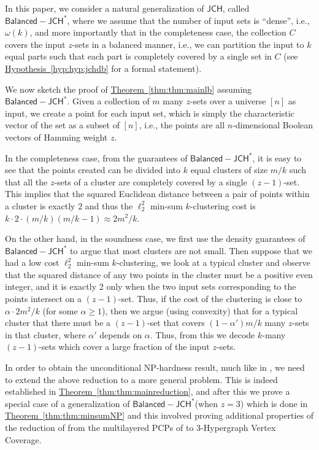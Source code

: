 \documentclass[10pt,a4paper]{amsart}
\newcommand{\namedref}[2]{\hyperref[#2]{#1~\ref*{#2}}}
\newcommand{\thmref}[1]{\namedref{Theorem}{thm:#1}}
\newcommand{\hypref}[1]{\namedref{Hypothesis}{hyp:#1}}
\newcommand{\JCH}{$\mathsf{JCH}$\xspace}
\newcommand{\JCHDB}{$\mathsf{Balanced-JCH}^*$\xspace}
\begin{document}
In this paper, we consider a natural generalization of \JCH, called \JCHDB, where we assume that the number of input sets is ``dense'', i.e., $\omega(k)$, and more importantly that in the completeness case,  the collection $C$ covers the input $z$-sets in a balanced manner, i.e., we can partition the input to $k$ equal parts such that each part is completely covered by a single set in $C$ (see \hypref{hyp:jchdb} for a formal statement). 


We now sketch the proof of \thmref{thm:mainlb} assuming \JCHDB. Given a collection of $m$ many $z$-sets over a universe $[n]$ as input, we create a point for each input set, which is simply the characteristic vector of the set as a subset of $[n]$, i.e., the points are all $n$-dimensional Boolean vectors of Hamming
weight $z$. 

In the
completeness case, from the guarantees of \JCHDB, it is easy to see that the points created can be divided into $k$ equal clusters of size $m/k$ such that all the $z$-sets of a cluster are completely covered by a single $(z-1)$-set. This implies that the squared Euclidean distance between a pair of points within a cluster is exactly $2$ and thus the $\ell_2^2$ min-sum $k$-clustering cost is $k\cdot 2\cdot (m/k)(m/k-1)\approx 2m^2/k$.

On the other hand, in the soundness case, we first use the density guarantees of \JCHDB to argue that most clusters are not small. Then suppose that we had a low cost $\ell_2^2$ min-sum $k$-clustering, we look at a typical cluster and observe that the squared distance  of any two points  in the cluster must be a positive even integer, and it is exactly 2 only when the two input sets corresponding to the points intersect on a $(z-1)$-set. Thus, if the cost of the clustering is close to $\alpha \cdot 2m^2/k$ (for some $\alpha\ge 1$), then we argue (using convexity) that for a typical cluster that there must be a $(z-1)$-set that covers $(1-\alpha')m/k$ many $z$-sets in that cluster, where $\alpha'$ depends on $\alpha$. Thus, from this we decode $k$-many $(z-1)$-sets which cover a large fraction of the input $z$-sets. 

In order to obtain the unconditional NP-hardness result, much like in \cite{Cohen-AddadSL22}, we need to extend the above reduction to a more general problem. This is indeed established in \thmref{thm:mainreduction}, and after this we  prove a special case of a generalization of \JCHDB (when $z=3$) which is done  in \thmref{thm:minsumNP}  and this involved proving additional properties of the reduction of \cite{Cohen-AddadSL22} from the multilayered PCPs of \cite{DGKR05, Khot02} to $3$-Hypergraph Vertex Coverage.
\end{document}

